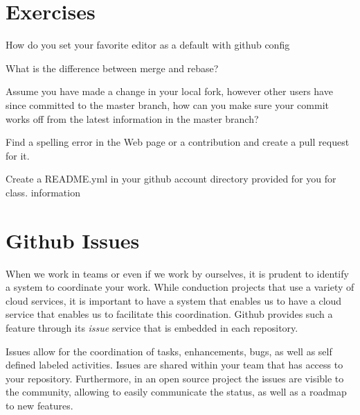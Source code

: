 \section{Exercises}

\begin{exercise}
\label{E:Github.1} How do you set your favorite editor as a default with
  github config
\end{exercise}

\begin{exercise}
\label{E:Github.2} What is the difference between merge and rebase?
\end{exercise}

\begin{exercise}
\label{E:Github.3} Assume you have made a change in your local fork,
  however other users have since committed to the master branch, how
  can you make sure your commit works off from the latest information
  in the master branch?
\end{exercise}

\begin{exercise}
\label{E:Github.4} Find a spelling error in the Web page or a
  contribution and create a pull request for it.
\end{exercise}

\begin{exercise}
\label{E:Gitlab.5} Create a README.yml in your github account directory
  provided for you for class.  information
\end{exercise}



\section{Github Issues}\label{S:git-issues}



When we work in teams or even if we work by ourselves, it is prudent to
identify a system to coordinate your work. While conduction projects
that use a variety of cloud services, it is important to have a system
that enables us to have a cloud service that enables us to facilitate
this coordination. Github provides such a feature through its {\em
  issue} service that is embedded in each repository. 


Issues allow for the coordination of tasks, enhancements, bugs, as
well as self defined labeled activities. Issues are shared within your
team that has access to your repository. Furthermore, in an open
source project the issues are visible to the community, allowing to
easily communicate the status, as well as a roadmap to new features. 


